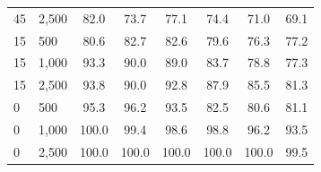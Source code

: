 \documentclass[twoside,11pt]{article}\usepackage[]{graphicx}\usepackage[]{xcolor}
\newenvironment{knitrout}{}{} %
\begin{document}
\begin{knitrout}
\begin{landscape}
\begin{longtable}[t]{llcccccc}
\hspace{1em}45 & 2,500 & 82.0 & 73.7 & 77.1 & 74.4 & 71.0 & 69.1\\
\hspace{1em}15 & 500 & 80.6 & 82.7 & 82.6 & 79.6 & 76.3 & 77.2\\
\hspace{1em}15 & 1,000 & 93.3 & 90.0 & 89.0 & 83.7 & 78.8 & 77.3\\
\hspace{1em}15 & 2,500 & 93.8 & 90.0 & 92.8 & 87.9 & 85.5 & 81.3\\
\hspace{1em}0 & 500 & 95.3 & 96.2 & 93.5 & 82.5 & 80.6 & 81.1\\
\hspace{1em}0 & 1,000 & 100.0 & 99.4 & 98.6 & 98.8 & 96.2 & 93.5\\
\hspace{1em}0 & 2,500 & 100.0 & 100.0 & 100.0 & 100.0 & 100.0 & 99.5\\*
\end{longtable}
\end{landscape}

\end{knitrout}


\vskip 0.2in

\end{document}
